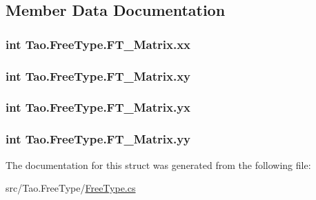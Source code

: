 \subsection{Member Data Documentation}
\hypertarget{struct_tao_1_1_free_type_1_1_f_t___matrix_a015a0727c05977ffb1a1fe7eb87d1728}{
\subsubsection[{xx}]{\setlength{\rightskip}{0pt plus 5cm}int {\bf Tao.FreeType.FT\_\-Matrix.xx}}}
\label{struct_tao_1_1_free_type_1_1_f_t___matrix_a015a0727c05977ffb1a1fe7eb87d1728}
\hypertarget{struct_tao_1_1_free_type_1_1_f_t___matrix_a51feca80fb49e326e0b36b5f425e3dcd}{
\subsubsection[{xy}]{\setlength{\rightskip}{0pt plus 5cm}int {\bf Tao.FreeType.FT\_\-Matrix.xy}}}
\label{struct_tao_1_1_free_type_1_1_f_t___matrix_a51feca80fb49e326e0b36b5f425e3dcd}
\hypertarget{struct_tao_1_1_free_type_1_1_f_t___matrix_a1f79d52747b8d059bff7f9c270a9eb96}{
\subsubsection[{yx}]{\setlength{\rightskip}{0pt plus 5cm}int {\bf Tao.FreeType.FT\_\-Matrix.yx}}}
\label{struct_tao_1_1_free_type_1_1_f_t___matrix_a1f79d52747b8d059bff7f9c270a9eb96}
\hypertarget{struct_tao_1_1_free_type_1_1_f_t___matrix_ad60423063006cf6072825d474678a013}{
\subsubsection[{yy}]{\setlength{\rightskip}{0pt plus 5cm}int {\bf Tao.FreeType.FT\_\-Matrix.yy}}}
\label{struct_tao_1_1_free_type_1_1_f_t___matrix_ad60423063006cf6072825d474678a013}


The documentation for this struct was generated from the following file:\begin{DoxyCompactItemize}
\item 
src/Tao.FreeType/\hyperlink{_free_type_8cs}{FreeType.cs}\end{DoxyCompactItemize}
